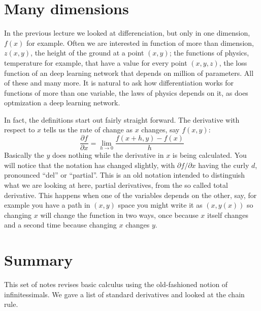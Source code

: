 \documentclass[12pt]{article}
\begin{document}
\section*{Many dimensions}

In the previous lecture we looked at differenciation, but only in one
dimension, $f(x)$ for example. Often we are interested in function of
more than dimension, $z(x,y)$, the height of the ground at a point
$(x,y)$; the functions of physics, temperature for example, that have
a value for every point $(x,y,z)$, the loss function of an deep
learning network that depends on million of parameters. All of these
and many more. It is natural to ask how differentiation works for
functions of more than one variable, the laws of physics depends on
it, as does optmization a deep learning network.

In fact, the definitions start out fairly straight forward. The derivative with respect to $x$ tells us the rate of change as $x$ changes, say $f(x,y)$:
\begin{equation}
  \frac{\partial f}{\partial x}=\lim_{h\rightarrow 0}\frac{f(x+h,y)-f(x)}{h}
\end{equation}
Basically the $y$ does nothing while the derivative in $x$ is being calculated. You will notice that the notation has changed slightly, with $\partial f/\partial x$ having the curly $d$, pronounced ``del'' or ``partial''. This is an old notation intended to distinguish what we are looking at here, partial derivatives, from the so called total derivative. This happens when one of the variables depends on the other, say, for example you have a path in $(x,y)$ space you might write it as $(x,y(x))$ so changing $x$ will change the function in two ways, once because $x$ itself changes and a second time because changing $x$ changes $y$. 


\section*{Summary}

This set of notes revises basic calculus using the old-fashioned
notion of infinitessimals. We gave a list of standard derivatives and
looked at the chain rule. 
\end{document}
